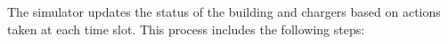The simulator updates the status of the building and chargers based on actions taken at each time slot. 
This process includes the following steps: 

